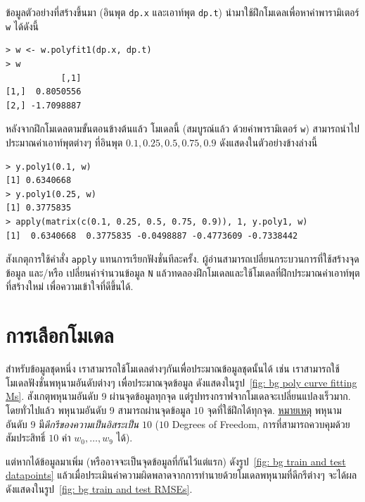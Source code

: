 ข้อมูลตัวอย่างที่สร้างขึ้นมา (อินพุต \texttt{dp.x} และเอาท์พุต \texttt{dp.t}) 
นำมาใช้ฝึกโมเดลเพื่อหาค่าพารามิเตอร์ \texttt{w} ได้ดังนี้

\begin{verbatim}
> w <- w.polyfit1(dp.x, dp.t)
> w
           [,1]
[1,]  0.8050556
[2,] -1.7098887
\end{verbatim}

หลังจากฝึกโมเดลตามขั้นตอนข้างต้นแล้ว 
โมเดลนี้ (สมบูรณ์แล้ว ด้วยค่าพารามิเตอร์ \texttt{w})
สามารถนำไปประมาณค่าเอาท์พุตต่างๆ ที่อินพุต $0.1, 0.25, 0.5, 0.75, 0.9$ 
ดังแสดงในตัวอย่างข้างล่างนี้

\begin{verbatim}
> y.poly1(0.1, w)
[1] 0.6340668
> y.poly1(0.25, w)
[1] 0.3775835
> apply(matrix(c(0.1, 0.25, 0.5, 0.75, 0.9)), 1, y.poly1, w)
[1]  0.6340668  0.3775835 -0.0498887 -0.4773609 -0.7338442
\end{verbatim}
สังเกตุการใช้คำสั่ง \texttt{apply} แทนการเรียกฟังชั่นทีละครั้ง.
ผู้อ่านสามารถเปลี่ยนกระบวนการที่ใช้สร้างจุดข้อมูล และ/หรือ เปลี่ยนค่าจำนวนข้อมูล \texttt{N} 
แล้วทดลองฝึกโมเดลและใช้โมเดลที่ฝึกประมาณค่าเอาท์พุตที่สร้างใหม่ เพื่อความเข้าใจที่ดีขึ้นได้.

\section{การเลือกโมเดล}
\label{section: Model selection}

สำหรับข้อมูลชุดหนึ่ง เราสามารถใช้โมเดลต่างๆกันเพื่อประมาณข้อมูลชุดนั้นได้  เช่น เราสามารถใช้โมเดลฟังชั่นพหุนามอันดับต่างๆ เพื่อประมาณจุดข้อมูล ดังแสดงในรูป~\ref{fig: bg poly curve fitting Ms}.
สังเกตุพหุนามอันดับ 9 ผ่านจุดข้อมูลทุกจุด แต่รูปทรงกราฟจากโมเดลจะเปลี่ยนแปลงเร็วมาก.
โดยทั่วไปแล้ว พหุนามอันดับ 9 สามารถผ่านจุดข้อมูล $10$ จุดที่ใช้ฝึกได้ทุกจุด.
\underline{หมายเหตุ} พหุนามอันดับ 9 มี\textit{ดีกรีของความเป็นอิสระเป็น} $10$ ($10$ Degrees of Freedom, การที่สามารถควบคุมด้วยสัมประสิทธิ์ $10$ ค่า $w_0, \ldots, w_9$ ได้). 

แต่หากได้ข้อมูลมาเพิ่ม (หรืออาจจะเป็นจุดข้อมูลที่กันไว้แต่แรก) ดังรูป~\ref{fig: bg train and test datapoints}
แล้วเมื่อประเมินค่าความผิดพลาดจากการทำนายด้วยโมเดลพหุนามที่ดีกรีต่างๆ
จะได้ผลดังแสดงในรูป~\ref{fig: bg train and test RMSEs}.

